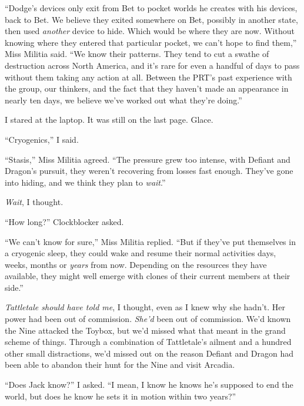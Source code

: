 ``Dodge's devices only exit from Bet to pocket worlds he creates with his devices, back to Bet.  We believe they exited somewhere on Bet, possibly in another state, then used \emph{another} device to hide.  Which would be where they are now.  Without knowing where they entered that particular pocket, we can't hope to find them,'' Miss Militia said.  ``We know their patterns.  They tend to cut a swathe of destruction across North America, and it's rare for even a handful of days to pass without them taking any action at all.  Between the PRT's past experience with the group, our thinkers, and the fact that they haven't made an appearance in nearly ten days, we believe we've worked out what they're doing.''



I stared at the laptop.  It was still on the last page.  Glace.



``Cryogenics,'' I said.



``Stasis,'' Miss Militia agreed.  ``The pressure grew too intense, with Defiant and Dragon's pursuit, they weren't recovering from losses fast enough.  They've gone into hiding, and we think they plan to \emph{wait}.''



\emph{Wait}, I thought.



``How long?'' Clockblocker asked.



``We can't know for sure,''  Miss Militia replied.  ``But if they've put themselves in a cryogenic sleep, they could wake and resume their normal activities days, weeks, months or \emph{years} from now.  Depending on the resources they have available, they might well emerge with clones of their current members at their side.''



\emph{Tattletale should have told me}, I thought, even as I knew why she hadn't.  Her power had been out of commission.  \emph{She'd} been out of commission.  We'd known the Nine attacked the Toybox, but we'd missed what that meant in the grand scheme of things.  Through a combination of Tattletale's ailment and a hundred other small distractions, we'd missed out on the reason Defiant and Dragon had been able to abandon their hunt for the Nine and visit Arcadia.



``Does Jack know?'' I asked.  ``I mean, I know he knows he's supposed to end the world, but does he know he sets it in motion within two years?''



